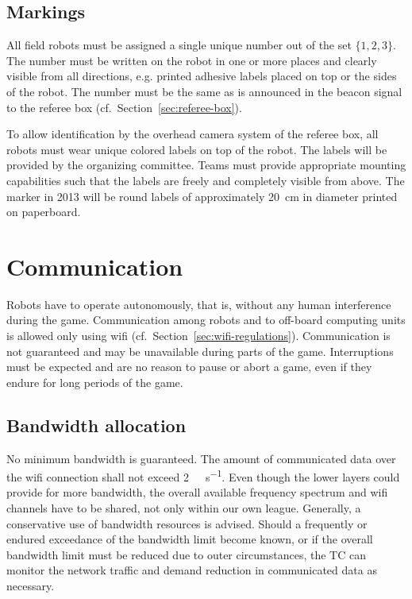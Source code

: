 \documentclass[12pt,twoside]{article}
\newcommand{\refsec}[1]{Section~\ref{#1}}
\begin{document}
\subsection{Markings}
\label{sec:robot-markings}
All field robots must be assigned a single unique number out of the
set $\{1, 2, 3\}$. The number must be written on the robot in one or
more places and clearly visible from all directions, e.g. printed
adhesive labels placed on top or the sides of the robot. The number
must be the same as is announced in the beacon signal to the referee
box (cf.~\refsec{sec:referee-box}).

To allow identification by the overhead camera system of the referee
box, all robots must wear unique colored labels on top of the
robot. The labels will be provided by the organizing committee. Teams
must provide appropriate mounting capabilities such that the labels
are freely and completely visible from above. The marker in 2013 will
be round labels of approximately \SI{20}{\centi\meter} in diameter
printed on paperboard.

\section{Communication}
\label{sec:communication}

Robots have to operate autonomously, that is, without any human
interference during the game. Communication among robots and to
off-board computing units is allowed only using wifi
(cf.~\refsec{sec:wifi-regulations}). Communication is not guaranteed
and may be unavailable during parts of the game. Interruptions must be
expected and are no reason to pause or abort a game, even if they
endure for long periods of the game.

\subsection{Bandwidth allocation}
\label{sec:bandwidth}
No minimum bandwidth is guaranteed. The amount of communicated data
over the wifi connection shall not exceed
\SI[per-mode=symbol]{2}{\mega\bit\per\second}. Even though the lower layers could
provide for more bandwidth, the overall available frequency spectrum
and wifi channels have to be shared, not only within our own
league. Generally, a conservative use of bandwidth resources is
advised. Should a frequently or endured exceedance of the bandwidth
limit become known, or if the overall bandwidth limit must be reduced
due to outer circumstances, the TC can monitor the network traffic and
demand reduction in communicated data as necessary.
\end{document}
